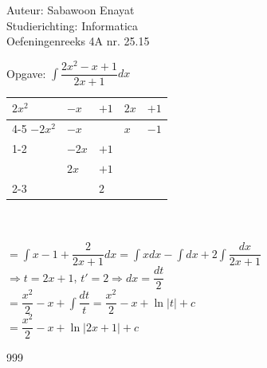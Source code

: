 \documentclass[a4paper]{article}
\begin{document}
  
\noindent \large Auteur: Sabawoon Enayat \\
\noindent \large Studierichting: Informatica\\
\noindent \large Oefeningenreeks 4A nr. 25.15 \\

\newcommand{\dint}{\displaystyle\int}

\medskip

\normalsize

Opgave: $\dint \dfrac{2x^2 - x + 1}{2x + 1} dx$\\

\begin{tabular}{lll|ll}
	$2x^2$  &	$-x$	&	$+1$	&	$2x$	&	$+1$	\\ \cline{4-5}
	$-2x^2$	&	$-x$	&			&	$x$		&	$-1$	\\ \cline{1-2}
			&	$-2x$	&	$+1$	&			&			\\
			&	$2x$	&	$+1$	&			&			\\ \cline{2-3}
			&			&	$2$		&			&			\\
\end{tabular}\\\\

$= \dint x - 1 + \dfrac{2}{2x + 1} dx = \dint x dx - \dint dx + 2\dint \dfrac{dx}{2x + 1}$\\

$\Rightarrow t = 2x + 1$, $t' = 2 \Rightarrow dx = \dfrac{dt}{2}$\\

$= \dfrac{x^2}{2} - x + \dint \dfrac{dt}{t} = \dfrac{x^2}{2} - x + \ln |t| + c$\\

$= \dfrac{x^2}{2} - x + \ln |2x + 1| + c$\\

\begin{thebibliography}{999}
\end{thebibliography}
\end{document}
